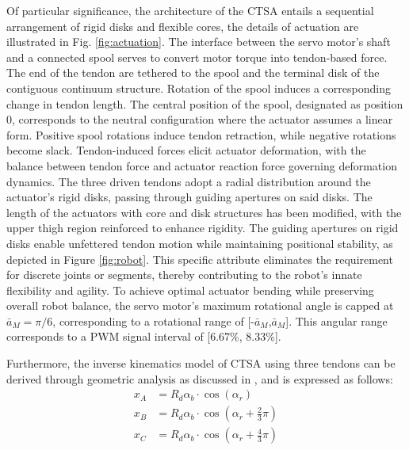 Of particular significance, the architecture of the \ac{CTSA} entails a sequential arrangement of rigid disks and flexible cores, the details of actuation are illustrated in Fig. \ref{fig:actuation}. The interface between the servo motor's shaft and a connected spool serves to convert motor torque into tendon-based force. The end of the tendon are tethered to the spool and the terminal disk of the contiguous continuum structure. Rotation of the spool induces a corresponding change in tendon length. The central position of the spool, designated as position 0, corresponds to the neutral configuration where the actuator assumes a linear form. Positive spool rotations induce tendon retraction, while negative rotations become slack. Tendon-induced forces elicit actuator deformation, with the balance between tendon force and actuator reaction force governing deformation dynamics. The three driven tendons adopt a radial distribution around the actuator's rigid disks, passing through guiding apertures on said disks. The length of the actuators with core and disk structures has been modified, with the upper thigh region reinforced to enhance rigidity. The guiding apertures on rigid disks enable unfettered tendon motion while maintaining positional stability, as depicted in Figure \ref{fig:robot}. This specific attribute eliminates the requirement for discrete joints or segments, thereby contributing to the robot's innate flexibility and agility. To achieve optimal actuator bending while preserving overall robot balance, the servo motor's maximum rotational angle is capped at $\bar{a}_M = \pi/6$, corresponding to a rotational range of [-$\bar{a}_M$,$\bar{a}_M$]. This angular range corresponds to a \ac{PWM} signal interval of [6.67\%, 8.33\%].


Furthermore, the inverse kinematics model of \ac{CTSA} using three tendons can be derived through geometric analysis as discussed in \cite{muralidharan2021Soft}, and is expressed as follows:
\begin{equation}
    \begin{aligned}
    x_A &= R_d\alpha_b\cdot{\cos(\alpha_r)} \\
    x_B &= R_d\alpha_b\cdot{\cos(\alpha_r+\frac{2}{3}\pi)} \\
    x_C &= R_d\alpha_b\cdot{\cos(\alpha_r+\frac{4}{3}\pi)}
    \end{aligned}
    \label{eq:value2motor}
\end{equation}

